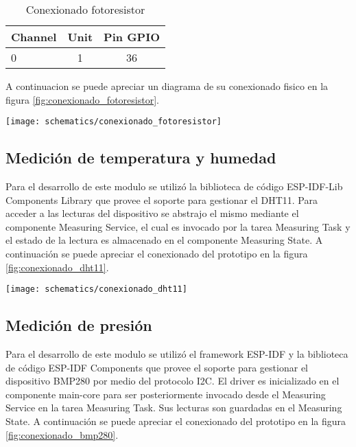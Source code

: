 \vspace{0.5cm}
\begin{table}[h]
\centering
\caption[Conexionado fotoresistor]{Conexionado fotoresistor}
\begin{tabular}{l c c}
\toprule
\textbf{Channel} & \textbf{Unit} & \textbf{Pin GPIO}\\
\midrule
0 & 1 & 36 \\
\bottomrule
\hline
\end{tabular}
\label{tab:conexionado_fotoresistor}
\end{table}

A continuacion se puede apreciar un diagrama de su conexionado fisico en la figura \ref{fig:conexionado_fotoresistor}.

\begin{center}
  \texttt{[image: schematics/conexionado\_fotoresistor]}
    \label{fig:conexionado_fotoresistor}
\end{center}


\subsection{Medición de temperatura y humedad}

Para el desarrollo de este modulo se utilizó la biblioteca de código ESP-IDF-Lib Components Library \cite{esp_idf_lib_website} que provee el soporte para gestionar el DHT11. Para acceder a las lecturas del dispositivo se abstrajo el mismo mediante el componente Measuring Service, el cual es invocado por la tarea Measuring Task y el estado de la lectura es almacenado en el componente Measuring State.
A continuación se puede apreciar el conexionado del prototipo en la figura \ref{fig:conexionado_dht11}.

\begin{center}
  \texttt{[image: schematics/conexionado\_dht11]}
    \label{fig:conexionado_dht11}
\end{center}



\subsection{Medición de presión}
Para el desarrollo de este modulo se utilizó el framework ESP-IDF y la biblioteca de código ESP-IDF Components que provee el soporte para gestionar el dispositivo BMP280 por medio del protocolo I2C. El driver es inicializado en el componente main-core para ser posteriormente invocado desde el Measuring Service en la tarea Measuring Task. Sus lecturas son guardadas en el Measuring State. A continuación se puede apreciar el conexionado del prototipo en la figura \ref{fig:conexionado_bmp280}.
  
